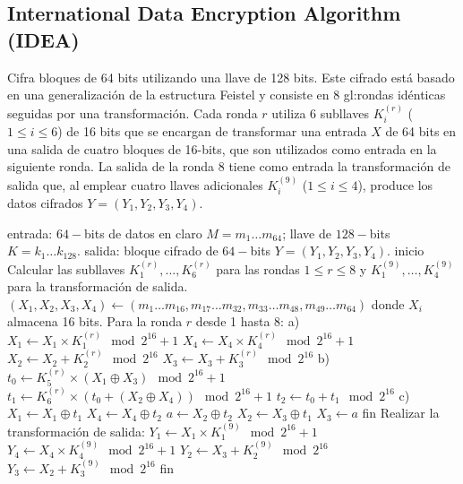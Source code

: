 \subsection{International Data Encryption Algorithm (IDEA)}

Cifra bloques de 64 bits utilizando una llave de 128 bits. Este cifrado
está basado en una generalización de la estructura Feistel y consiste en
8 \glspl{gl:ronda} idénticas seguidas por una transformación. Cada ronda $r$
utiliza 6 subllaves $K^{(r)}_i$ ($1 \leq i \leq 6$) de 16 bits que se
encargan de transformar una entrada $X$ de 64 bits en una salida de
cuatro bloques de 16-bits, que son utilizados como entrada en la
siguiente ronda. La salida de la ronda 8 tiene como entrada la
transformación de salida que, al emplear cuatro llaves adicionales
$K^{(9)}_i$ ($1 \leq i \leq 4$), produce los datos cifrados
$Y = (Y_1, Y_2, Y_3, Y_4)$.


\begin{pseudocodigo}[caption={IDEA, cifrado.}, label={idea:1}]
  entrada:   $64-$bits de datos en claro $M = m_1 \dots m_{64}$;
             llave de $128-$bits $ K = k_1 \dots k_{128}$.
  salida:    bloque cifrado de $64-$bits $Y = (Y_1, Y_2, Y_3, Y_4)$.
  inicio
    Calcular las subllaves $K^{(r)}_1, \dots, K^{(r)}_{6}$ para las rondas $1 \leq r \leq 8$ y $K^{(9)}_1, \dots, K^{(9)}_{4}$
    para la transformación de salida.
    $(X_1, X_2, X_3, X_4) \leftarrow (m_1 \dots m_{16}, m_{17} \dots m_{32}, m_{33} \dots m_{48}, m_{49} \dots m_{64})$
        donde $X_i$ almacena 16 bits.
    Para la ronda $r$ desde 1 hasta 8:
      a) $X_1 \leftarrow X_1 \times K_1^{(r)} \mod2^{16} + 1$
         $X_4 \leftarrow X_4 \times K_4^{(r)} \mod2^{16} + 1$
         $X_2 \leftarrow X_2 + K_2^{(r)} \mod2^{16}$
         $X_3 \leftarrow X_3 + K_3^{(r)} \mod2^{16}$
      b) $t_0 \leftarrow K_5^{(r)} \times (X_1 \oplus X_3) \mod2^{16} + 1$
         $t_1 \leftarrow K_6^{(r)} \times (t_0 + (X_2 \oplus X_4)) \mod2^{16} + 1$
         $t_2 \leftarrow t_0 + t_1 \mod2^{16}$
      c) $X_1 \leftarrow X_1 \oplus t_1$
         $X_4 \leftarrow X_4 \oplus t_2$
         $a \leftarrow X_2 \oplus t_2$
         $X_2 \leftarrow X_3 \oplus t_1$
         $X_3 \leftarrow a$
    fin
    Realizar la transformación de salida:
      $Y_1 \leftarrow X_1 \times K_1^{(9)} \mod2^{16} + 1$
      $Y_4 \leftarrow X_4 \times K_4^{(9)} \mod2^{16} + 1$
      $Y_2 \leftarrow X_3 + K_2^{(9)} \mod2^{16}$
      $Y_3 \leftarrow X_2 + K_3^{(9)} \mod2^{16}$
  fin
\end{pseudocodigo}

